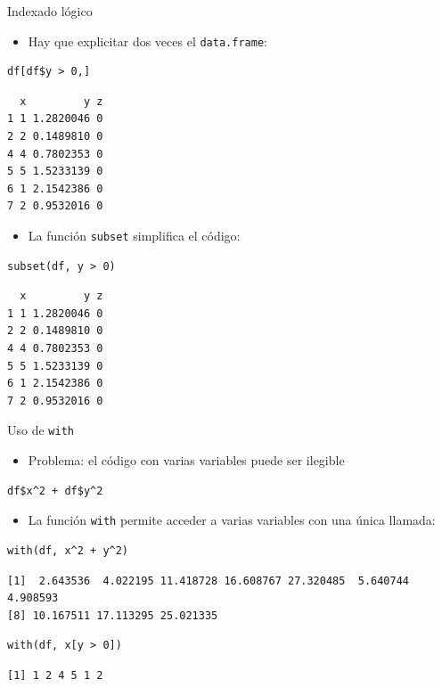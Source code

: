 \documentclass[aspectratio=169, usenames,svgnames,dvipsnames]{beamer}
\begin{document}
\begin{frame}[label={sec:org1265dbb},fragile]{Indexado lógico}
 \begin{itemize}
\item Hay que explicitar dos veces el \texttt{data.frame}:
\end{itemize}
\lstset{language=r,label= ,caption= ,captionpos=b,numbers=none}
\begin{lstlisting}
df[df$y > 0,]
\end{lstlisting}

\begin{verbatim}
  x         y z
1 1 1.2820046 0
2 2 0.1489810 0
4 4 0.7802353 0
5 5 1.5233139 0
6 1 2.1542386 0
7 2 0.9532016 0
\end{verbatim}


\begin{itemize}
\item La función \texttt{subset} simplifica el código:
\end{itemize}
\lstset{language=r,label= ,caption= ,captionpos=b,numbers=none}
\begin{lstlisting}
subset(df, y > 0)
\end{lstlisting}

\begin{verbatim}
  x         y z
1 1 1.2820046 0
2 2 0.1489810 0
4 4 0.7802353 0
5 5 1.5233139 0
6 1 2.1542386 0
7 2 0.9532016 0
\end{verbatim}
\end{frame}

\begin{frame}[label={sec:orgbecbb7f},fragile]{Uso de \texttt{with}}
 \begin{itemize}
\item Problema: el código con varias variables puede ser ilegible
\end{itemize}
\lstset{language=r,label= ,caption= ,captionpos=b,numbers=none}
\begin{lstlisting}
df$x^2 + df$y^2
\end{lstlisting}
\begin{itemize}
\item La función \texttt{with} permite acceder a varias variables con una única llamada:
\end{itemize}
\lstset{language=r,label= ,caption= ,captionpos=b,numbers=none}
\begin{lstlisting}
with(df, x^2 + y^2)
\end{lstlisting}

\begin{verbatim}
[1]  2.643536  4.022195 11.418728 16.608767 27.320485  5.640744  4.908593
[8] 10.167511 17.113295 25.021335
\end{verbatim}


\lstset{language=r,label= ,caption= ,captionpos=b,numbers=none}
\begin{lstlisting}
with(df, x[y > 0])
\end{lstlisting}

\begin{verbatim}
[1] 1 2 4 5 1 2
\end{verbatim}
\end{frame}
\end{document}
